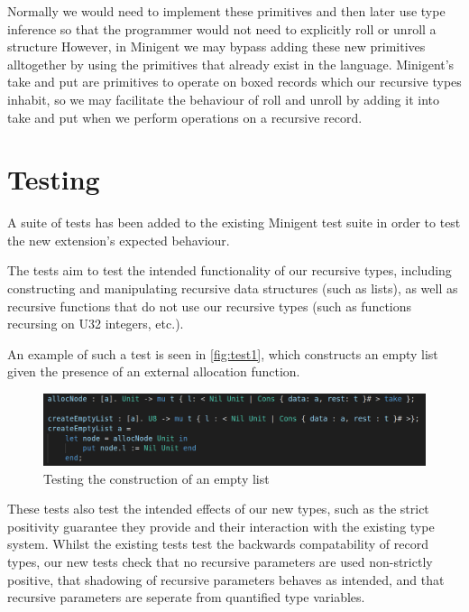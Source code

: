 Normally we would need to implement these primitives and then later use type inference so that
the programmer would not need to explicitly roll or unroll a structure However,
in Minigent we may bypass adding these new primitives alltogether by using the primitives
that already exist in the language. Minigent's \textsf{take} and \textsf{put} are primitives to
operate on boxed records which our recursive types inhabit, so we may facilitate the behaviour
of roll and unroll by adding it into take and put when we perform operations on a recursive record.


\section{Testing}


A suite of tests has been added to the existing Minigent test suite in order to test the new extension's 
expected behaviour.

The tests aim to test the intended functionality of our recursive types, including constructing and manipulating
recursive data structures (such as lists), as well as recursive functions that do not use our recursive types 
(such as functions recursing on U32 integers, etc.).

An example of such a test is seen in \autoref{fig:test1}, which constructs an empty list given the presence
of an external allocation function.

\begin{figure}
    \centering
    \includegraphics[width=\linewidth]{content/test1.png}
    \caption{Testing the construction of an empty list }
    \label{fig:test1}
\end{figure}

These tests also test the intended effects of our new types, such as the strict positivity guarantee they provide
and their interaction with the existing type system. Whilst the existing tests test the backwards compatability of
record types, our new tests check that no recursive parameters are used non-strictly positive, that shadowing of recursive
parameters behaves as intended, and that recursive parameters are seperate from quantified type variables.

